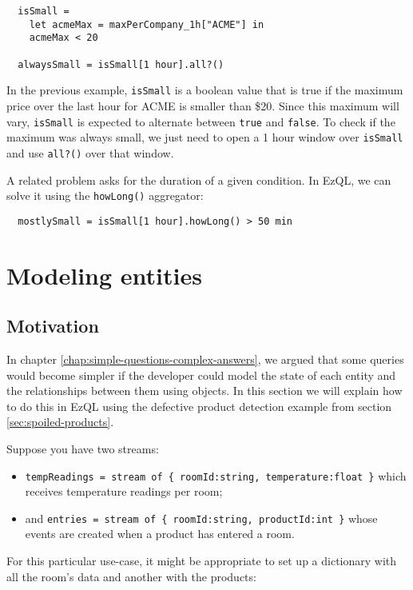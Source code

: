 \documentclass[a4,11pt]{report}
\begin{document}
\begin{lstlisting}
  isSmall =
    let acmeMax = maxPerCompany_1h["ACME"] in
    acmeMax < 20

  alwaysSmall = isSmall[1 hour].all?()
\end{lstlisting}

In the previous example, \verb=isSmall= is a boolean value that is
true if the maximum price over the last hour for ACME is smaller than
\$20. Since this maximum will vary, \verb=isSmall= is expected to
alternate between \verb=true= and \verb=false=. To check if the
maximum was always small, we just need to open a 1 hour window over
\verb=isSmall= and use \verb=all?()= over that window.

A related problem asks for the duration of a given condition. In EzQL,
we can solve it using the \verb=howLong()= aggregator:

\begin{lstlisting}
  mostlySmall = isSmall[1 hour].howLong() > 50 min
\end{lstlisting}

\section{Modeling entities}

\label{sec:entities}

\subsection{Motivation}

In chapter \ref{chap:simple-questions-complex-answers}, we argued that
some queries would become simpler if the developer could model the
state of each entity and the relationships between them using
objects. In this section we will explain how to do this in EzQL using
the defective product detection example from section
\ref{sec:spoiled-products}.

Suppose you have two streams:

\begin{itemize}
\item \verb!tempReadings = stream of { roomId:string, temperature:float }! which receives
  temperature readings per room;
\item and \verb!entries = stream of { roomId:string, productId:int }! whose events are
  created when a product has entered a room.
\end{itemize}

For this particular use-case, it might be appropriate to set up a
dictionary with all the room's data and another with the products:
\end{document}
